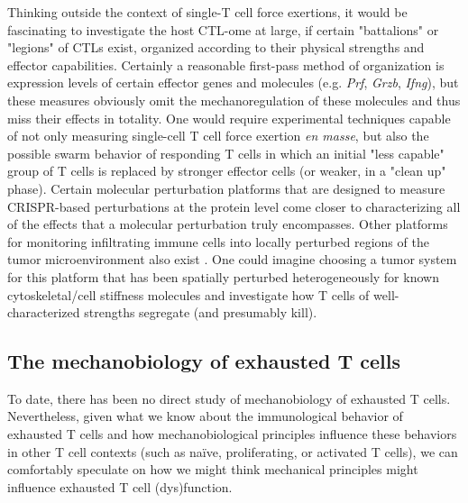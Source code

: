 Thinking outside the context of single-T cell force exertions, it would be fascinating to investigate the host CTL-ome at large, if certain "battalions" or "legions" of CTLs exist, organized according to their physical strengths and effector capabilities. Certainly a reasonable first-pass method of organization is expression levels of certain effector genes and molecules (e.g. \textit{Prf}, \textit{Grzb}, \textit{Ifng}), but these measures obviously omit the mechanoregulation of these molecules and thus miss their effects in totality. One would require experimental techniques capable of not only measuring single-cell T cell force exertion \textit{en masse}, but also the possible swarm behavior of responding T cells in which an initial "less capable" group of T cells is replaced by stronger effector cells (or weaker, in a "clean up" phase). Certain molecular perturbation platforms that are designed to measure CRISPR-based perturbations at the protein level \cite{Wroblewska2018} come closer to characterizing all of the effects that a molecular perturbation truly encompasses. Other platforms for monitoring infiltrating immune cells into locally perturbed regions of the tumor microenvironment also exist \cite{MaximeDhainaut2021}. One could imagine choosing a tumor system for this platform that has been spatially perturbed heterogeneously for known cytoskeletal/cell stiffness molecules and investigate how T cells of well-characterized strengths segregate (and presumably kill).

\subsection{The mechanobiology of exhausted T cells}

To date, there has been no direct study of mechanobiology of exhausted T cells. Nevertheless, given what we know about the immunological behavior of exhausted T cells and how mechanobiological principles influence these behaviors in other T cell contexts (such as na{\"i}ve, proliferating, or activated T cells), we can comfortably speculate on how we might think mechanical principles might influence exhausted T cell (dys)function.

